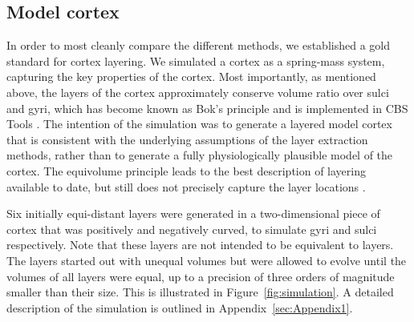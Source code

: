 \subsection{Model cortex 
\label{sec:Simulation}}
In order to most cleanly compare the different methods, we established a gold standard for cortex layering. We simulated a cortex as a spring-mass system, capturing the key properties of the cortex. Most importantly, as mentioned above, the  layers of the cortex approximately conserve volume ratio over sulci and gyri, which has become known as Bok's principle \cite{Bok1929,Waehnert2014} and is implemented in CBS Tools \cite{Bazin2014}. The intention of the simulation was to generate a layered model cortex that is consistent with the underlying assumptions of the layer extraction methods, rather than to generate a fully physiologically plausible model of the cortex. The equivolume principle leads to the best description of  layering available to date, but still does not precisely capture the layer locations \cite{Waehnert2016}.

Six initially equi-distant layers were generated in a two-dimensional piece of cortex that was positively and negatively curved, to simulate gyri and sulci respectively. Note that these layers are not intended to be equivalent to  layers. The layers started out with unequal volumes but were allowed to evolve until the volumes of all layers were equal, up to a precision of three orders of magnitude smaller than their size. This is illustrated in Figure~\ref{fig:simulation}. A detailed description of the simulation is outlined in Appendix~\ref{sec:Appendix1}.



